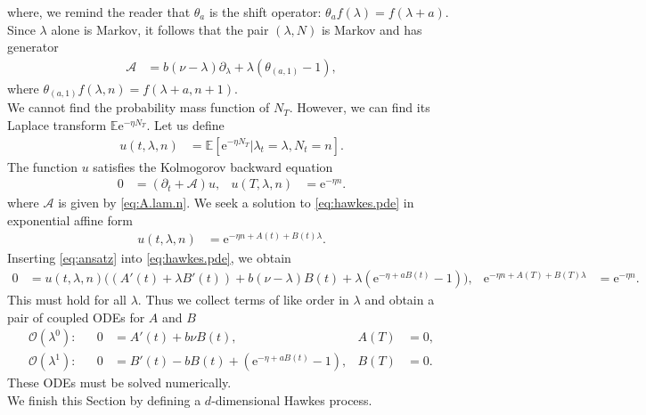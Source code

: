 \documentclass[12pt]{book}
\numberwithin{equation}{chapter}
\theoremstyle{plain}
\numberwithin{theorem}{section}
\theoremstyle{definition}
\numberwithin{exercise}{chapter}
\newcommand{\<}{\langle}
\renewcommand{\>}{\rangle}
\renewcommand{\(}{\left(}
\renewcommand{\)}{\right)}
\renewcommand{\[}{\left[}
\renewcommand{\]}{\right]}
\newcommand\Eb{\mathds{E}}
\newcommand\Ac{\mathscr{A}}
\newcommand\Oc{\mathscr{O}}
\newcommand\lam{\lambda}
\renewcommand\d{\partial}
\newcommand\ee{\mathrm{e}}
\begin{document}
where, we remind the reader that $\theta_a$ is the shift operator: $\theta_a f(\lam) = f(\lam+a)$.  Since $\lam$ alone is Markov, it follows that the pair $(\lam,N)$ is Markov and has generator
\begin{align}
\Ac
	&=	b ( \nu - \lam ) \d_\lam + \lam \( \theta_{(a,1)} - 1 \) , \label{eq:A.lam.n}
\end{align}
where $\theta_{(a,1)}f(\lam,n) = f(\lam+a,n+1)$.
\\[0.5em]
We cannot find the probability mass function of $N_T$.  However, we can find its Laplace transform $\Eb \ee^{ - \eta N_T}$.
Let us define
\begin{align}
u(t,\lam,n)
	&=	\Eb[ \ee^{- \eta N_T} | \lam_t = \lam , N_t = n ] .
\end{align}
The function $u$ satisfies the Kolmogorov backward equation
\begin{align}
0
	&=	( \d_t + \Ac ) u , &
u(T,\lam,n)
	&=	\ee^{- \eta n} . \label{eq:hawkes.pde}
\end{align}
where $\Ac$ is given by \eqref{eq:A.lam.n}.  We seek a solution to \eqref{eq:hawkes.pde} in exponential affine form
\begin{align}
u(t, \lam, n)
	&=	\ee^{- \eta n + A(t) + B(t) \lam } . \label{eq:ansatz}
\end{align}
Inserting \eqref{eq:ansatz} into \eqref{eq:hawkes.pde}, we obtain
\begin{align}
0
	&=	u(t,\lam,n) \Big( (A'(t) + \lam B'(t)) + b ( \nu - \lam ) B(t) + \lam (\ee^{-\eta + a B(t) }-1) \Big) , &
\ee^{- \eta n + A(T) + B(T) \lam }
	&=	\ee^{- \eta n  } .
\end{align}
This must hold for all $\lam$.  Thus we collect terms of like order in $\lam$ and obtain a pair of coupled ODEs for $A$ and $B$
\begin{align}
\Oc(\lam^0):&&
0
	&=	A'(t) + b \nu B(t) , &
A(T)
	&=	0 , \label{eq:ODE.A} \\
\Oc(\lam^1):&&
0
	&=	B'(t) - b B(t) + (\ee^{-\eta + a B(t) }-1) , &
B(T)
	&=	0 . \label{eq:ODE.B}
\end{align}
These ODEs must be solved numerically.
\\[0.5em]
We finish this Section by defining a $d$-dimensional Hawkes process.
\end{document}
